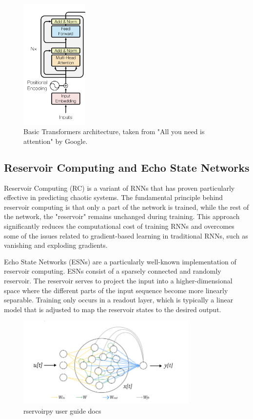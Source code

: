 \documentclass[11pt]{article}
\begin{document}
\begin{figure}[h]
\centering
\includegraphics[width=0.3\textwidth]{transformer-basic.png}
\caption{Basic Transformers architecture, taken from "All you need is attention" by Google. }
\end{figure}

\subsection{Reservoir Computing and Echo State Networks}
Reservoir Computing (RC) is a variant of RNNs that has proven particularly effective in predicting chaotic systems. The fundamental principle behind reservoir computing is that only a part of the network is trained, while the rest of the network, the "reservoir" remains unchanged during training. This approach significantly reduces the computational cost of training RNNs and overcomes some of the issues related to gradient-based learning in traditional RNNs, such as vanishing and exploding gradients.

Echo State Networks (ESNs) are a particularly well-known implementation of reservoir computing. ESNs consist of a sparsely connected and randomly reservoir. The reservoir serves to project the input into a higher-dimensional space where the different parts of the input sequence become more linearly separable. Training only occurs in a readout layer, which is typically a linear model that is adjusted to map the reservoir states to the desired output.

\begin{figure}[h] 
\centering 
\includegraphics[width=0.8\textwidth]{echo_diagram.png} 
\caption{rservoirpy user guide docs}
\end{figure}
\end{document}

